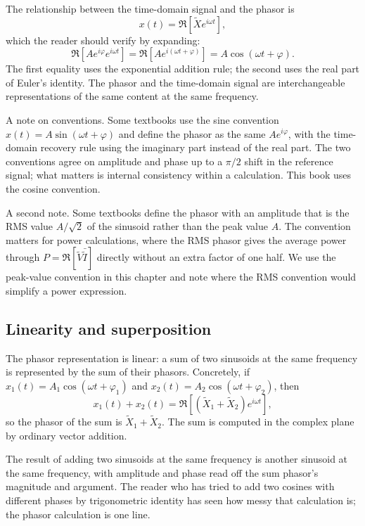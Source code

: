 The relationship between the time-domain signal and the phasor is
\[
x(t) = \Re\left[\tilde{X} e^{i\omega t}\right],
\]
which the reader should verify by expanding:
\[
\Re\left[A e^{i\varphi} e^{i\omega t}\right] = \Re\left[A e^{i(\omega t + \varphi)}\right] = A\cos(\omega t + \varphi).
\]
The first equality uses the exponential addition rule; the second
uses the real part of Euler's identity. The phasor and the
time-domain signal are interchangeable representations of the
same content at the same frequency.

A note on conventions. Some textbooks use the sine convention
$x(t) = A \sin(\omega t + \varphi)$ and define the phasor as the
same $A e^{i\varphi}$, with the time-domain recovery rule using
the imaginary part instead of the real part. The two conventions
agree on amplitude and phase up to a $\pi/2$ shift in the
reference signal; what matters is internal consistency within a
calculation. This book uses the cosine convention.

A second note. Some textbooks define the phasor with an
amplitude that is the RMS value $A/\sqrt{2}$ of the sinusoid
rather than the peak value $A$. The convention matters for power
calculations, where the RMS phasor gives the average power
through $P = \Re[\tilde{V}\bar{\tilde{I}}]$ directly without an
extra factor of one half. We use the peak-value convention in
this chapter and note where the RMS convention would simplify a
power expression.

\subsection{Linearity and superposition}

The phasor representation is linear: a sum of two sinusoids at
the same frequency is represented by the sum of their phasors.
Concretely, if $x_{1}(t) = A_{1}\cos(\omega t + \varphi_{1})$ and
$x_{2}(t) = A_{2}\cos(\omega t + \varphi_{2})$, then
\[
x_{1}(t) + x_{2}(t) = \Re\left[(\tilde{X}_{1} + \tilde{X}_{2}) e^{i\omega t}\right],
\]
so the phasor of the sum is $\tilde{X}_{1} + \tilde{X}_{2}$. The
sum is computed in the complex plane by ordinary vector addition.

The result of adding two sinusoids at the same frequency is
another sinusoid at the same frequency, with amplitude and phase
read off the sum phasor's magnitude and argument. The reader who
has tried to add two cosines with different phases by trigonometric
identity has seen how messy that calculation is; the phasor
calculation is one line.

